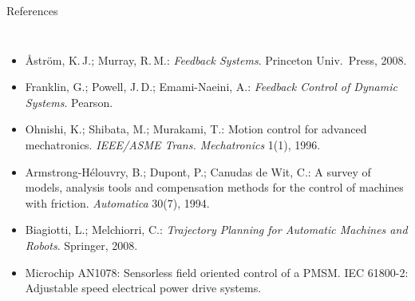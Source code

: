 \documentclass[aspectratio=169,10pt]{beamer}
\begin{document}
\begin{frame}[t]{References}
\begin{columns}[T,onlytextwidth]
\begin{itemize}
\item Åström, K.\,J.; Murray, R.\,M.: \emph{Feedback Systems}. Princeton Univ.\ Press, 2008.
\item Franklin, G.; Powell, J.\,D.; Emami-Naeini, A.: \emph{Feedback Control of Dynamic Systems}. Pearson.
\item Ohnishi, K.; Shibata, M.; Murakami, T.: Motion control for advanced mechatronics. \emph{IEEE/ASME Trans. Mechatronics} 1(1), 1996.
\item Armstrong-Hélouvry, B.; Dupont, P.; Canudas de Wit, C.: A survey of models, analysis tools and compensation methods for the control of machines with friction. \emph{Automatica} 30(7), 1994.
\item Biagiotti, L.; Melchiorri, C.: \emph{Trajectory Planning for Automatic Machines and Robots}. Springer, 2008.
\item Microchip AN1078: Sensorless field oriented control of a PMSM. \quad IEC 61800-2: Adjustable speed electrical power drive systems.
\end{itemize}
\end{columns}
\end{frame}
\end{document}
